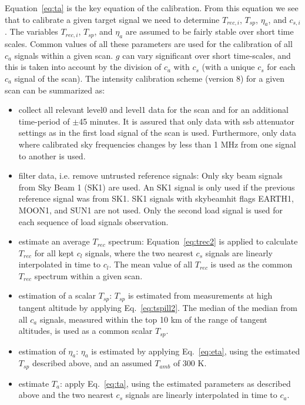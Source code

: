 Equation~\ref{eq:ta} is the key equation of the calibration.
From this equation we see that to calibrate a given target signal
we need to determine \(T_{rec,i}\), \(T_{sp}\), \(\eta_{a}\),
and \(c_{s,i}\). The variables \(T_{rec,i}\), \(T_{sp}\), and \(\eta_{a}\)
are assumed to be fairly stable over short time scales.
Common values of all these parameters are used for
the calibration of all \(c_{a}\) signals within a given scan.
\(g\) can vary significant over short time-scales,
and this is taken into account by the division of \(c_{a}\) with
\(c_{s}\) (with a unique \(c_{s}\) for each \(c_{a}\)
signal of the scan). The intensity calibration scheme (version 8)
for a given scan can be summarized as:
\begin{itemize}
\item collect all relevant level0 and level1 data for the scan and for an
additional time-period of \(\pm\)45 minutes.
It is assured that only data with ssb attenuator settings
as in the first load signal of the scan is used.
Furthermore, only data where calibrated sky frequencies changes by less
than 1 MHz from one signal to another is used.

\item filter data, i.e. remove untrusted reference signals:\newline
Only sky beam signals from Sky Beam 1 (SK1) are used.
An SK1 signal is only used if the previous
reference signal was from SK1.
SK1 signals with skybeamhit flags EARTH1, MOON1, and SUN1 are not used.
Only the second load signal is used for each sequence of load signals
observation.

\item estimate an average \(T_{rec}\) spectrum:\newline
Equation~\ref{eq:trec2} is applied to calculate \(T_{rec}\)
for all kept \(c_{l}\) signals, where
the two nearest \(c_{s}\) signals are linearly interpolated
in time to \(c_{l}\).
The mean value of all \(T_{rec}\) is used as the
common \(T_{rec}\) spectrum within a given scan.
\item estimation of a scalar \(T_{sp}\):\newline
\(T_{sp}\) is estimated from measurements at high tangent altitude
by applying Eq.~\ref{eq:tspill2}.
The median of the median
from all \(c_{a}\) signals, measured within the top 10 km
of the range of tangent altitudes, is used as a common scalar \(T_{sp}\).
\item estimation of \(\eta_{a}\):\newline
\(\eta_{a}\) is estimated by applying Eq.~\ref{eq:eta},
using the estimated \(T_{sp}\) described above, and an
assumed \(T_{amb}\) of 300 K.
\item estimate \(T_{a}\): \newline
apply Eq.~\ref{eq:ta}, using the estimated parameters as described
above and
the two nearest \(c_{s}\) signals are linearly interpolated
in time to \(c_{a}\).
\end{itemize}



